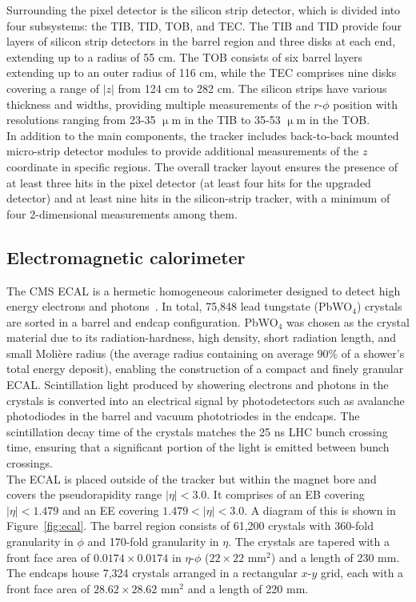Surrounding the pixel detector is the silicon strip detector, which is divided into four subsystems: the \ac{TIB}, \ac{TID}, \ac{TOB}, and \ac{TEC}. 
The \ac{TIB} and \ac{TID} provide four layers of silicon strip detectors in the barrel region and three disks at each end, extending up to a radius of 55 cm. 
The \ac{TOB} consists of six barrel layers extending up to an outer radius of 116 cm, while the \ac{TEC} comprises nine disks covering a range of $|z|$ from 124 cm to 282 cm. 
The silicon strips have various thickness and widths, providing multiple measurements of the $r$-$\phi$ position with resolutions ranging from 23-35 $\upmu$m in the \ac{TIB} to 35-53 $\upmu$m in the \ac{TOB}. \\

In addition to the main components, the tracker includes back-to-back mounted micro-strip detector modules to provide additional measurements of the $z$ coordinate in specific regions. 
The overall tracker layout ensures the presence of at least three hits in the pixel detector (at least four hits for the upgraded detector) and at least nine hits in the silicon-strip tracker, with a minimum of four 2-dimensional measurements among them.

\subsection{Electromagnetic calorimeter}

The \ac{CMS} \ac{ECAL} is a hermetic homogeneous calorimeter designed to detect high energy electrons and photons~\cite{CMS_Setup,CMS:2013lxn}. 
In total, 75,848 lead tungstate (PbWO$_4$) crystals are sorted in a barrel and endcap configuration. 
PbWO$_4$ was chosen as the crystal material due to its radiation-hardness, high density, short radiation length, and small Molière radius (the average radius containing on average 90\% of
a shower’s total energy deposit), enabling the construction of a compact and finely granular \ac{ECAL}. 
Scintillation light produced by showering electrons and photons in the crystals is converted into an electrical signal by photodetectors such as avalanche photodiodes in the barrel and vacuum phototriodes in the endcaps. 
The scintillation decay time of the crystals matches the 25 ns \ac{LHC} bunch crossing time, ensuring that a significant portion of the light is emitted between bunch crossings. \\

The \ac{ECAL} is placed outside of the tracker but within the magnet bore and covers the pseudorapidity range $|\eta| < 3.0$. 
It comprises of an \ac{EB} covering $|\eta| < 1.479$ and an \ac{EE} covering $1.479 < |\eta| < 3.0$. 
A diagram of this is shown in Figure~\ref{fig:ecal}.
The barrel region consists of 61,200 crystals with 360-fold granularity in $\phi$ and 170-fold granularity in $\eta$. 
The crystals are tapered with a front face area of $0.0174 \times 0.0174$ in $\eta$-$\phi$ ($22 \times 22$ mm$^2$) and a length of 230 mm. 
The endcaps house 7,324 crystals arranged in a rectangular $x$-$y$ grid, each with a front face area of $28.62 \times 28.62$ mm$^2$ and a length of 220 mm. \\

